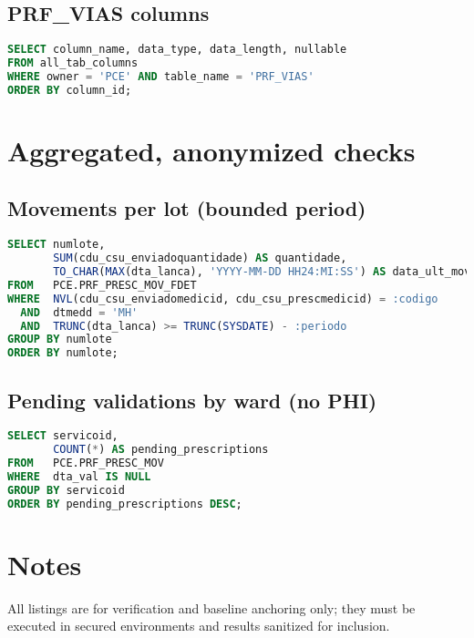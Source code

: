 \subsection*{PRF\_VIAS columns}
\begin{lstlisting}[language=SQL]
SELECT column_name, data_type, data_length, nullable
FROM all_tab_columns
WHERE owner = 'PCE' AND table_name = 'PRF_VIAS'
ORDER BY column_id;
\end{lstlisting}

\section{Aggregated, anonymized checks}
\subsection*{Movements per lot (bounded period)}
\begin{lstlisting}[language=SQL]
SELECT numlote,
       SUM(cdu_csu_enviadoquantidade) AS quantidade,
       TO_CHAR(MAX(dta_lanca), 'YYYY-MM-DD HH24:MI:SS') AS data_ult_mov
FROM   PCE.PRF_PRESC_MOV_FDET
WHERE  NVL(cdu_csu_enviadomedicid, cdu_csu_prescmedicid) = :codigo
  AND  dtmedd = 'MH'
  AND  TRUNC(dta_lanca) >= TRUNC(SYSDATE) - :periodo
GROUP BY numlote
ORDER BY numlote;
\end{lstlisting}

\subsection*{Pending validations by ward (no PHI)}
\begin{lstlisting}[language=SQL]
SELECT servicoid,
       COUNT(*) AS pending_prescriptions
FROM   PCE.PRF_PRESC_MOV
WHERE  dta_val IS NULL
GROUP BY servicoid
ORDER BY pending_prescriptions DESC;
\end{lstlisting}

\section{Notes}
All listings are for verification and baseline anchoring only; they must be executed in secured environments and results sanitized for inclusion.